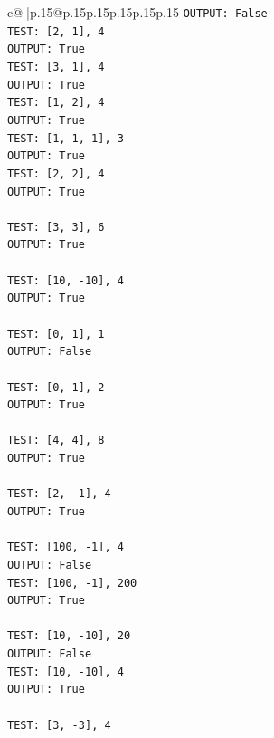 \documentclass{article}
\begin{document}
{\begin{supertabular}{c@{$\;$}|p{.15\linewidth}@{}p{.15\linewidth}p{.15\linewidth}p{.15\linewidth}p{.15\linewidth}p{.15\linewidth}}
{{{\texttt{OUTPUT: False} \\
\texttt{TEST: {[}2, 1{]}, 4} \\
\texttt{OUTPUT: True} \\
\texttt{TEST: {[}3, 1{]}, 4} \\
\texttt{OUTPUT: True} \\
\texttt{TEST: {[}1, 2{]}, 4} \\
\texttt{OUTPUT: True} \\
\texttt{TEST: {[}1, 1, 1{]}, 3} \\
\texttt{OUTPUT: True} \\
\texttt{TEST: {[}2, 2{]}, 4} \\
\texttt{OUTPUT: True} \\
\\ 
\texttt{TEST: {[}3, 3{]}, 6} \\
\texttt{OUTPUT: True} \\
\\ 
\texttt{TEST: {[}10, {-}10{]}, 4} \\
\texttt{OUTPUT: True} \\
\\ 
\texttt{TEST: {[}0, 1{]}, 1} \\
\texttt{OUTPUT: False} \\
\\ 
\texttt{TEST: {[}0, 1{]}, 2} \\
\texttt{OUTPUT: True} \\
\\ 
\texttt{TEST: {[}4, 4{]}, 8} \\
\texttt{OUTPUT: True} \\
\\ 
\texttt{TEST: {[}2, {-}1{]}, 4} \\
\texttt{OUTPUT: True} \\
\\ 
\texttt{TEST: {[}100, {-}1{]}, 4} \\
\texttt{OUTPUT: False} \\
\texttt{TEST: {[}100, {-}1{]}, 200} \\
\texttt{OUTPUT: True} \\
\\ 
\texttt{TEST: {[}10, {-}10{]}, 20} \\
\texttt{OUTPUT: False} \\
\texttt{TEST: {[}10, {-}10{]}, 4} \\
\texttt{OUTPUT: True} \\
\\ 
\texttt{TEST: {[}3, {-}3{]}, 4} \\
}}}
\end{supertabular}}
\end{document}
